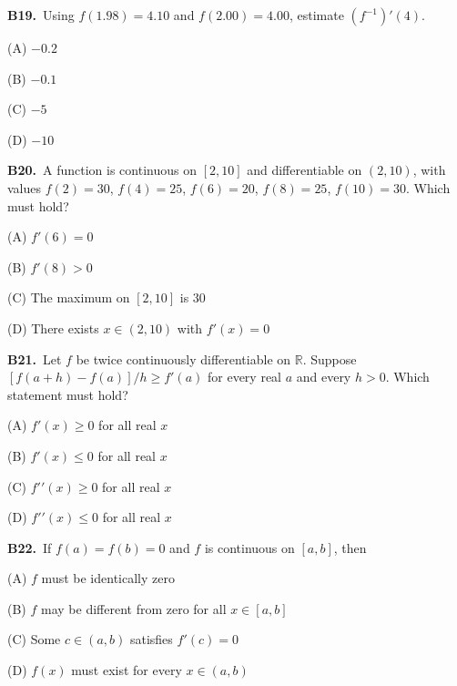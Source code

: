 \documentclass[11pt]{article}
\begin{document}
\bigskip\noindent\textbf{B19.}\ Using $f(1.98)=4.10$ and $f(2.00)=4.00$, estimate $(f^{-1})'(4)$.
\begin{list}{}{\setlength{\leftmargin}{3em}\setlength{\labelwidth}{2.5em}\setlength{\itemsep}{0pt}\setlength{\topsep}{2pt}}
\item[(A)] $-0.2$
\item[(B)] $-0.1$
\item[(C)] $-5$
\item[(D)] $-10$
\end{list}

\bigskip\noindent\textbf{B20.}\ A function is continuous on $[2,10]$ and differentiable on $(2,10)$, with values $f(2)=30$, $f(4)=25$, $f(6)=20$, $f(8)=25$, $f(10)=30$. Which must hold?
\begin{list}{}{\setlength{\leftmargin}{3em}\setlength{\labelwidth}{2.5em}\setlength{\itemsep}{0pt}\setlength{\topsep}{2pt}}
\item[(A)] $f'(6)=0$
\item[(B)] $f'(8)>0$
\item[(C)] The maximum on $[2,10]$ is $30$
\item[(D)] There exists $x\in(2,10)$ with $f'(x)=0$
\end{list}

\bigskip\noindent\textbf{B21.}\ Let $f$ be twice continuously differentiable on $\mathbb R$. Suppose $[f(a+h)-f(a)]/h\ge f\prime(a)$ for every real $a$ and every $h>0$. Which statement must hold?
\begin{list}{}{\setlength{\leftmargin}{3em}\setlength{\labelwidth}{2.5em}\setlength{\itemsep}{0pt}\setlength{\topsep}{2pt}}
\item[(A)] $f\prime(x)\ge0$ for all real $x$
\item[(B)] $f\prime(x)\le0$ for all real $x$
\item[(C)] $f\prime\prime(x)\ge0$ for all real $x$
\item[(D)] $f\prime\prime(x)\le0$ for all real $x$
\end{list}

\bigskip\noindent\textbf{B22.}\ If $f(a)=f(b)=0$ and $f$ is continuous on $[a,b]$, then
\begin{list}{}{\setlength{\leftmargin}{3em}\setlength{\labelwidth}{2.5em}\setlength{\itemsep}{0pt}\setlength{\topsep}{2pt}}
\item[(A)] $f$ must be identically zero
\item[(B)] $f$ may be different from zero for all $x\in[a,b]$
\item[(C)] Some $c\in(a,b)$ satisfies $f'(c)=0$
\item[(D)] $f(x)$ must exist for every $x\in(a,b)$
\end{list}
\end{document}
